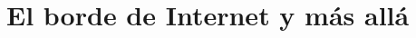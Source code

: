 \documentclass[12pt, letterpaper]{article}
\title{\doctitle}
\author{Juan Luis Serradilla Tormos}
\date{\monthname[\month] de \the\year}
\begin{document}
\pagestyle{fancy} %

\maketitle

\newpage
\tableofcontents

\newpage
\section{El borde de Internet y más allá}

\end{document}
